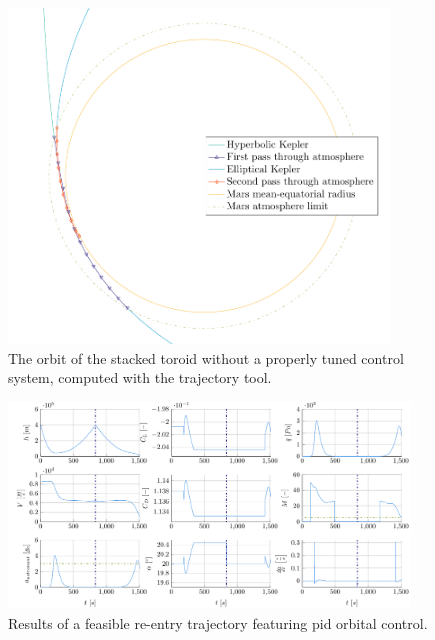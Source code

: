 \begin{figure}[h]
	\vspace{-0.5cm}
	\centering
	\includegraphics[width=0.9\textwidth]{Figure/orbital_model/orbit.pdf}
	\caption{ The orbit of the stacked toroid without a properly tuned control system, computed with the trajectory tool.}
	\vspace{-1cm}
	\label{fig:orbit}
\end{figure}

\begin{figure}
	\centering
	\includegraphics[width=0.95\textwidth]{Figure/orbital_model/orbit_results.pdf}
	\caption{Results of a feasible re-entry trajectory featuring \gls{pid} orbital control.}
	\label{fig:orbit_results}
\end{figure}
